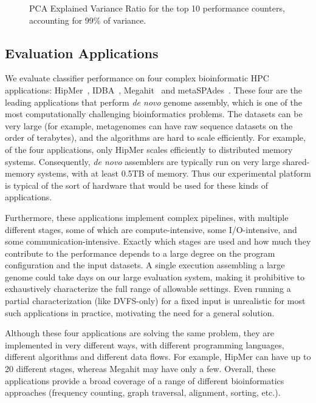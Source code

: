 \begin{figure}[t]
  \begin{centering}
    
    \caption{PCA Explained Variance Ratio for the top 10 performance counters, accounting for 99\% of variance.}
    \label{fig:pca-evr}
  \end{centering}
\end{figure}


\subsection{Evaluation Applications}
\label{sec:setup-evaluation}

We evaluate classifier performance on four complex bioinformatic HPC applications: HipMer~\cite{georganas2015hipmer}, IDBA~\cite{peng2012idba}, Megahit~\cite{li2015megahit} and metaSPAdes~\cite{nurk2016metaspades}.
These four are the leading applications that perform \emph{de novo} genome assembly, which is one of the most computationally challenging bioinformatics problems.
The datasets can be very large (for example, metagenomes can have raw sequence datasets on the order of terabytes), and the algorithms are hard to scale efficiently.
For example, of the four applications, only HipMer scales efficiently to distributed memory systems.
Consequently, \emph{de novo} assemblers are typically run on very large shared-memory systems, with at least 0.5TB of memory.
Thus our experimental platform is typical of the sort of hardware that would be used for these kinds of applications.

Furthermore, these applications implement complex pipelines, with multiple different stages, some of which are compute-intensive, some I/O-intensive, and some communication-intensive.
Exactly which stages are used and how much they contribute to the performance depends to a large degree on the program configuration and the input datasets.
A single execution assembling a large genome could take days on our large evaluation system, making it prohibitive to exhaustively characterize the full range of allowable settings.
Even running a partial characterization (like DVFS-only) for a fixed input is unrealistic for most such applications in practice, motivating the need for a general solution.

Although these four applications are solving the same problem, they are implemented in very different ways, with different programming languages, different algorithms and different data flows.
For example, HipMer can have up to 20 different stages, whereas Megahit may have only a few.
Overall, these applications provide a broad coverage of a range of different bioinformatics approaches (frequency counting, graph traversal, alignment, sorting, etc.).

